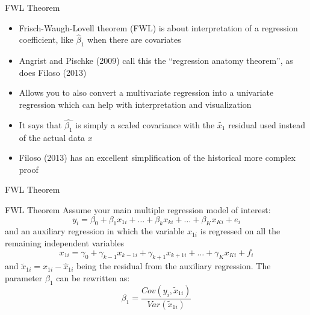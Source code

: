 \documentclass{beamer}
\begin{document}
\begin{frame}{FWL Theorem}

\begin{itemize}
\item Frisch-Waugh-Lovell theorem (FWL) is about interpretation of a regression coefficient, like $\widehat{\beta}_1$ when there are covariates
\item Angrist and Pischke (2009) call this the ``regression anatomy theorem'', as does Filoso (2013)
\item Allows you to also convert a multivariate regression into a univariate regression which can help with interpretation and visualization
\item It says that $\widehat{\beta_1}$ is simply a scaled covariance with the $\tilde{x_1}$ residual used instead of the actual data $x$
\item Filoso (2013) has an excellent simplification of the historical more complex proof
\end{itemize}

\end{frame}

		

\begin{frame}{FWL Theorem}

	\begin{block}{FWL Theorem }
	Assume your main multiple regression model of interest:$$y_i=\beta_0 + \beta_1x_{1i} + \dots + \beta_kx_{ki} + \dots + \beta_Kx_{Ki} + e_i$$ and an auxiliary regression in which the variable $x_{1i}$ is regressed on all the remaining independent variables$$x_{1i} = \gamma_0 + \gamma_{k-1}x_{k-1 i}+\gamma_{k+1}x_{k+1 i} + \dots + \gamma_Kx_{Ki}+f_i$$and $\tilde{x}_{1i} = x_{1i} - \widehat{x}_{1i}$ being the residual from the auxiliary regression. The parameter $\beta_1$ can be rewritten as:$$\beta_1=\frac{Cov(y_i,\tilde{x}_{1i})}{Var(\tilde{x}_{1i})}$$

	\end{block}

\end{frame}
\end{document}
